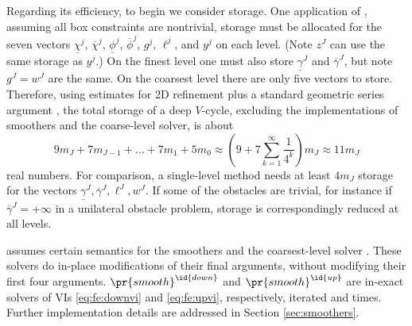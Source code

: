 \documentclass[letterpaper,final,12pt,reqno]{amsart}
\theoremstyle{cstyle}
\theoremstyle{cstyle*}
\theoremstyle{dstyle}
\numberwithin{equation}{section}
\numberwithin{figure}{section}
\numberwithin{table}{section}
\numberwithin{theorem}{section}
\begin{document}
Regarding its efficiency, to begin we consider storage.  One application of , assuming all box constraints are nontrivial, storage must be allocated for the seven vectors $\underline{\chi}^j$, $\overline{\chi}^j$, $\underline{\phi}^j$, $\overline{\phi}^j$, $g^j$, $\ell^j$, and $y^j$ on each level.  (Note $z^J$ can use the same storage as $y^j$.)  On the finest level one must also store $\underline{\gamma}^J$ and $\overline{\gamma}^J$, but note $g^J=w^J$ are the same.  On the coarsest level there are only five vectors to store.  Therefore, using estimates for 2D refinement plus a standard geometric series argument \cite{Trottenbergetal2001}, the total storage of a deep $V$-cycle, excluding the implementations of smoothers and the coarse-level solver, is about
\begin{equation}
9 m_J + 7 m_{J-1} + \dots + 7 m_1 + 5 m_0 \approx \left(9 + 7 \sum_{k=1}^\infty \frac{1}{4^k}\right) m_J \approx 11 m_J
\end{equation}
real numbers.  For comparison, a single-level method needs at least $4 m_J$ storage for the vectors $\underline{\gamma}^J,\overline{\gamma}^J,\ell^J,w^J$.  If some of the obstacles are trivial, for instance if $\overline{\gamma}^J=+\infty$ in a unilateral obstacle problem, storage is correspondingly reduced at all levels.

 assumes certain semantics for the smoothers  and the coarsest-level solver .  These solvers do in-place modifications of their final arguments, without modifying their first four arguments.  $\pr{smooth}^{\id{down}}$ and $\pr{smooth}^{\id{up}}$ are in-exact solvers of VIs \eqref{eq:fe:downvi} and \eqref{eq:fe:upvi}, respectively, iterated  and  times.  Further implementation details are addressed in Section \ref{sec:smoothers}.
\end{document}
